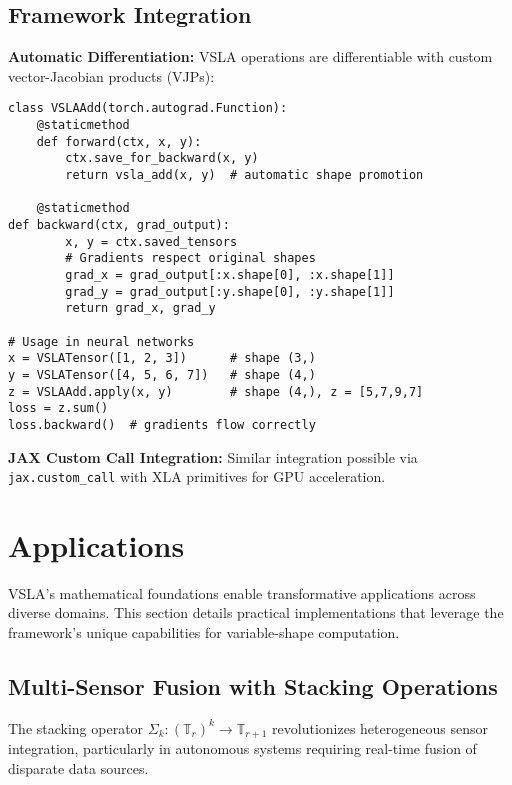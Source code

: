 \documentclass[11pt]{article}
\begin{document}
\subsection{Framework Integration}
\textbf{Automatic Differentiation:} VSLA operations are differentiable with custom vector-Jacobian products (VJPs):

\begin{tcolorbox}[colback=api,colframe=green!50!black,title=PyTorch Integration Example]
\begin{verbatim}
class VSLAAdd(torch.autograd.Function):
    @staticmethod
    def forward(ctx, x, y):
        ctx.save_for_backward(x, y)
        return vsla_add(x, y)  # automatic shape promotion
    
    @staticmethod  
def backward(ctx, grad_output):
        x, y = ctx.saved_tensors
        # Gradients respect original shapes
        grad_x = grad_output[:x.shape[0], :x.shape[1]]  
        grad_y = grad_output[:y.shape[0], :y.shape[1]]
        return grad_x, grad_y

# Usage in neural networks
x = VSLATensor([1, 2, 3])      # shape (3,)
y = VSLATensor([4, 5, 6, 7])   # shape (4,) 
z = VSLAAdd.apply(x, y)        # shape (4,), z = [5,7,9,7]
loss = z.sum()
loss.backward()  # gradients flow correctly
\end{verbatim}
\end{tcolorbox}

\textbf{JAX Custom Call Integration:} Similar integration possible via \texttt{jax.custom\_call} with XLA primitives for GPU acceleration.

\section{Applications}
\label{sec:applications}

VSLA's mathematical foundations enable transformative applications across diverse domains. This section details practical implementations that leverage the framework's unique capabilities for variable-shape computation.

\subsection{Multi-Sensor Fusion with Stacking Operations}

The stacking operator $\Sigma_k: (\mathbb{T}_r)^k \to \mathbb{T}_{r+1}$ revolutionizes heterogeneous sensor integration, particularly in autonomous systems requiring real-time fusion of disparate data sources.
\end{document}
